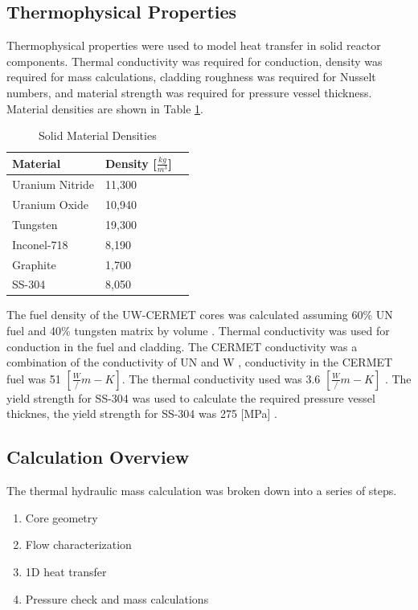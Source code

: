 \subsection{Thermophysical Properties}
Thermophysical properties were used to model heat transfer in solid reactor
components. Thermal conductivity was required for conduction, density was
required for mass calculations, cladding roughness was required for Nusselt
numbers, and material strength was required for pressure vessel thickness.
Material densities are shown in Table \ref{tab:densities}.

\begin{table}[h]
  \centering
  \caption{Solid Material Densities}
  \begin{tabular}{lll}
    \toprule
     Material        & Density  [$\frac{kg}{m^3}$]     \\ 
    \midrule                                  
     Uranium Nitride & 11,300 \\
     Uranium Oxide   & 10,940 \\
     Tungsten        & 19,300 \\
     Inconel-718     & 8,190  \\
     Graphite        & 1,700  \\
     SS-304          & 8,050
  \end{tabular}
  \label{tab:densities}
\end{table}

The fuel density of the UW-CERMET cores was calculated assuming 60\% UN fuel and
40\% tungsten matrix by volume \citep{conduct_cermet}. Thermal conductivity was
used for conduction in the fuel and cladding. The CERMET conductivity was a
combination of the conductivity of UN and W \citep{conduct_cermet}, conductivity
in the CERMET fuel was 51 $[\frac{W}/{m-K}]$. The \uox thermal conductivity used
was 3.6 $[\frac{W}/{m-K}]$ \citep{todreas_th}. The yield strength for SS-304 was
used to calculate the required pressure vessel thicknes, the yield strength for
SS-304 was 275 [MPa] \citep{ss_strength}.

\subsection{Calculation Overview}
The thermal hydraulic mass calculation was broken down into a series of steps.
\begin{enumerate}
    \item Core geometry
    \item Flow characterization
    \item 1D heat transfer
    \item Pressure check and mass calculations
\end{enumerate}

